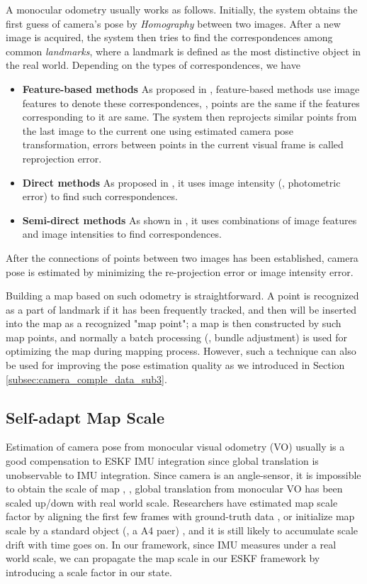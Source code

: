 A monocular odometry usually works as follows. Initially, the system obtains the first guess of camera's pose by \textit{Homography} \cite{fischler1981random} between two images. After a new image is acquired, the system then tries to find the correspondences among common \textit{landmarks}, where a landmark is defined as the most distinctive object in the real world. Depending on the types of correspondences, we have
\begin{itemize}
\item {\textbf{Feature-based methods} As proposed in \cite{davison2007monoslam, eade2007monocular, klein2007parallel, mur2015orb}, feature-based methods use image features to denote these correspondences, \eg, points are the same if the features corresponding to it are same. The system then reprojects similar points from the last image to the current one using estimated camera pose transformation, errors between points in the current visual frame is called reprojection error.}
\item {\textbf{Direct methods} As proposed in \cite{engel2014lsd}, it uses image intensity (\eg, photometric error) to find such correspondences.}
\item {\textbf{Semi-direct methods} As shown in \cite{forster2014svo}, it uses combinations of image features and image intensities to find correspondences.}
\end{itemize}
After the connections of points  between two images has been established, camera pose is estimated by minimizing the re-projection error or image intensity error.

Building a map based on such odometry is straightforward. A point is recognized as a part of landmark if it has been frequently tracked, and then will be inserted into the map as a recognized "map point"; a map is then constructed by such map points, and normally a batch processing (\eg, bundle adjustment) is used for optimizing the map during mapping process. However, such a technique can also be used for improving the pose estimation quality as we introduced in Section \ref{subsec:camera_comple_data_sub3}.

\subsection{Self-adapt Map Scale}
\label{subsec:camera_comple_data_sub2}

Estimation of camera pose from monocular visual odometry (VO) usually is a good compensation to ESKF IMU integration since global translation is unobservable to IMU integration. Since camera is an angle-sensor, it is impossible to obtain the scale of map \cite{forster2014svo}, \ie, global translation from monocular VO has been scaled up/down with real world scale. Researchers have estimated map scale factor by aligning the first few frames with ground-truth data \cite{forster2014svo}, or initialize map scale by a standard object (\eg, a A4 paer) \cite{davison2007monoslam}, and it is still likely to accumulate scale drift with time goes on. In our framework, since IMU measures under a real world scale, we can propagate the map scale in our ESKF framework by introducing a scale factor in our state. 

